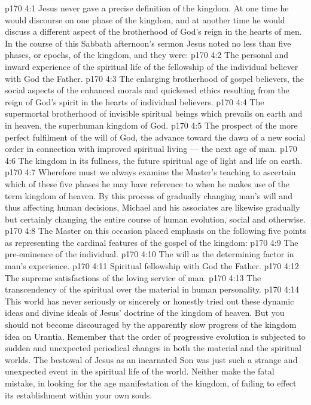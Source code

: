 \vs p170 4:1 Jesus never gave a precise definition of the kingdom. At one time he would discourse on one phase of the kingdom, and at another time he would discuss a different aspect of the brotherhood of God’s reign in the hearts of men. In the course of this Sabbath afternoon’s sermon Jesus noted no less than five phases, or epochs, of the kingdom, and they were:
\vs p170 4:2 \bibnobreakspace The personal and inward experience of the spiritual life of the fellowship of the individual believer with God the Father.
\vs p170 4:3 \bibnobreakspace The enlarging brotherhood of gospel believers, the social aspects of the enhanced morals and quickened ethics resulting from the reign of God’s spirit in the hearts of individual believers.
\vs p170 4:4 \bibnobreakspace The supermortal brotherhood of invisible spiritual beings which prevails on earth and in heaven, the superhuman kingdom of God.
\vs p170 4:5 \bibnobreakspace The prospect of the more perfect fulfilment of the will of God, the advance toward the dawn of a new social order in connection with improved spiritual living --- the next age of man.
\vs p170 4:6 \bibnobreakspace The kingdom in its fullness, the future spiritual age of light and life on earth.
\vs p170 4:7 \pc Wherefore must we always examine the Master’s teaching to ascertain which of these five phases he may have reference to when he makes use of the term kingdom of heaven. By this process of gradually changing man’s will and thus affecting human decisions, Michael and his associates are likewise gradually but certainly changing the entire course of human evolution, social and otherwise.
\vs p170 4:8 The Master on this occasion placed emphasis on the following five points as representing the cardinal features of the gospel of the kingdom:
\vs p170 4:9 \bibnobreakspace The pre\hyp{}eminence of the individual.
\vs p170 4:10 \bibnobreakspace The will as the determining factor in man’s experience.
\vs p170 4:11 \bibnobreakspace Spiritual fellowship with God the Father.
\vs p170 4:12 \bibnobreakspace The supreme satisfactions of the loving service of man.
\vs p170 4:13 \bibnobreakspace The transcendency of the spiritual over the material in human personality.
\vs p170 4:14 \pc This world has never seriously or sincerely or honestly tried out these dynamic ideas and divine ideals of Jesus’ doctrine of the kingdom of heaven. But you should not become discouraged by the apparently slow progress of the kingdom idea on Urantia. Remember that the order of progressive evolution is subjected to sudden and unexpected periodical changes in both the material and the spiritual worlds. The bestowal of Jesus as an incarnated Son was just such a strange and unexpected event in the spiritual life of the world. Neither make the fatal mistake, in looking for the age manifestation of the kingdom, of failing to effect its establishment within your own souls.

